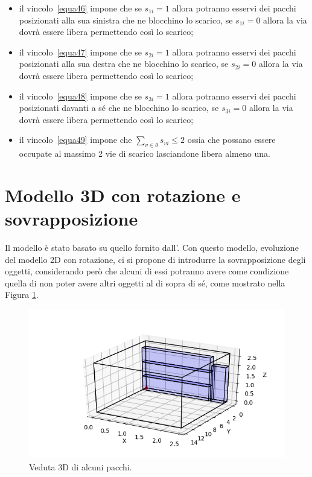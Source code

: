 \begin{itemize}
	\item il vincolo~\eqref{equa46} impone che se $s_{1i} = 1$ allora potranno esservi dei pacchi posizionati alla sua sinistra che ne blocchino lo scarico, se $s_{1i} = 0$ allora la via dovrà essere libera permettendo così lo scarico;
	\item il vincolo~\eqref{equa47} impone che se $s_{2i} = 1$ allora potranno esservi dei pacchi posizionati alla sua destra che ne blocchino lo scarico, se $s_{2i} = 0$ allora la via dovrà essere libera permettendo così lo scarico;
	\item il vincolo~\eqref{equa48} impone che se $s_{3i} = 1$ allora potranno esservi dei pacchi posizionati davanti a sé che ne blocchino lo scarico, se $s_{3i} = 0$ allora la via dovrà essere libera permettendo così lo scarico;
	\item il vincolo~\eqref{equa49} impone che $\sum_{v \in \theta} s_{vi} \leq 2$ ossia che possano essere occupate al massimo 2 vie di scarico lasciandone libera almeno una.
\end{itemize}

\newpage
\section{Modello 3D con rotazione e sovrapposizione}
Il modello è stato basato su quello fornito dall'.
Con questo modello, evoluzione del modello 2D con rotazione, ci si propone di introdurre la sovrapposizione degli oggetti, considerando però che alcuni di essi potranno avere come condizione quella di non poter avere altri oggetti al di sopra di sé, come mostrato nella Figura \ref{fig:3d_grafics}.

\begin{figure}[H]
	\begin{center} \includegraphics[scale=0.7]{figures/3d}
		\caption[Grafico con merci 3D]{Veduta 3D di alcuni pacchi.}
		\label{fig:3d_grafics}
	\end{center}
\end{figure}

